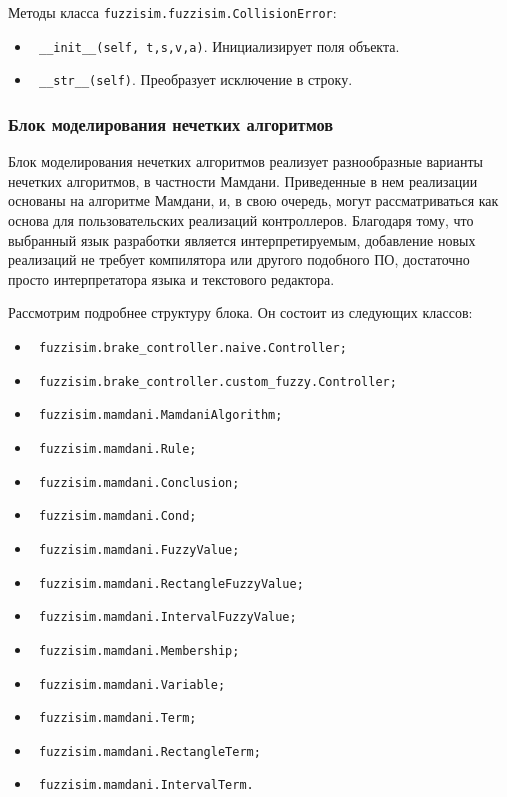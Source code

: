 Методы класса \lstinline!fuzzisim.fuzzisim.CollisionError!:
\begin{itemize}
	\item \lstinline! __init__(self, t,s,v,a)!. Инициализирует поля объекта.
	\item \lstinline! __str__(self)!.  Преобразует исключение в строку.
\end{itemize}



\subsubsection{ Блок моделирования нечетких алгоритмов }

Блок моделирования нечетких алгоритмов реализует разнообразные варианты нечетких алгоритмов, в частности Мамдани. Приведенные в нем реализации основаны на алгоритме Мамдани, и, в свою очередь, могут рассматриваться как основа для пользовательских реализаций контроллеров. Благодаря тому, что выбранный язык разработки является интерпретируемым, добавление новых реализаций не требует компилятора или другого подобного ПО, достаточно просто интерпретатора языка и текстового редактора.

Рассмотрим подробнее структуру блока. Он состоит из следующих классов:

\begin{itemize}
	\item \lstinline! fuzzisim.brake_controller.naive.Controller;!
	\item \lstinline! fuzzisim.brake_controller.custom_fuzzy.Controller;!
	\item \lstinline! fuzzisim.mamdani.MamdaniAlgorithm;!
	\item \lstinline! fuzzisim.mamdani.Rule;!
	\item \lstinline! fuzzisim.mamdani.Conclusion;!
	\item \lstinline! fuzzisim.mamdani.Cond;!
	\item \lstinline! fuzzisim.mamdani.FuzzyValue;!
	\item \lstinline! fuzzisim.mamdani.RectangleFuzzyValue;!
	\item \lstinline! fuzzisim.mamdani.IntervalFuzzyValue;!
	\item \lstinline! fuzzisim.mamdani.Membership;!
	\item \lstinline! fuzzisim.mamdani.Variable;!
	\item \lstinline! fuzzisim.mamdani.Term;!
	\item \lstinline! fuzzisim.mamdani.RectangleTerm;!
	\item \lstinline! fuzzisim.mamdani.IntervalTerm.!
\end{itemize}



